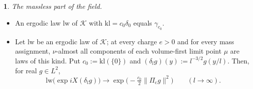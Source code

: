 \documentclass[11pt]{amsart}
\newcommand{\namedhead}{}
\theoremstyle{definition}
\newtheorem*{namedinner}{\namedhead}
\newenvironment{named}[1]{\renewcommand{\namedhead}{#1}\begin{namedinner}}{\end{namedinner}}
\begin{document}
\begin{named}{Theorem 4.3}
\emph{The massless part of the field.}
\begin{itemize}
\item[(a)] An ergodic law $\mathrm{lw}$ of $\mathcal K$ with $\mathrm{kl}=c_0\delta_0$ equals $\gamma_{c_0}$.
\item[(b)] Let $\mathrm{lw}$ be an ergodic law of $\mathcal K$; at every charge $e>0$ and for every mass assignment, $\nu$-almost all components of each volume-first limit point $\mu$ are laws of this kind.
Put $c_0:=\mathrm{kl}(\{0\})$ and $(\delta_lg)(y):=l^{-3/2}g(y/l)$.
Then, for real $g\in L^2$,
\begin{equation*}
\mathrm{lw}\bigl(\exp iX(\delta_lg)\bigr)\longrightarrow\exp\bigl(-\tfrac{c_0}2\|\Pi_{\mathrm c}g\|^2\bigr)\qquad(l\to\infty).
\end{equation*}
\end{itemize}
\end{named}
\end{document}
